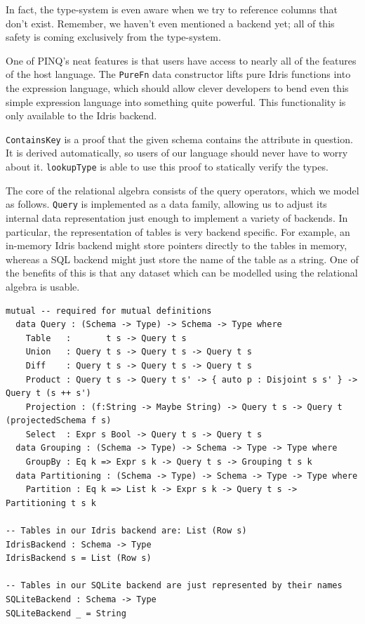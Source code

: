 \documentclass[12pt]{article}
\begin{document}
In fact, the type-system is even aware when we try to reference columns that don't exist.
Remember, we haven't even mentioned a backend yet; all of this safety is coming exclusively from the type-system.

One of PINQ's neat features is that users have access to nearly all of the features of the host language.
The \texttt{PureFn} data constructor lifts pure Idris functions into the expression language, which should allow clever developers to bend even this simple expression language into something quite powerful.
This functionality is only available to the Idris backend.

\texttt{ContainsKey} is a proof that the given schema contains the attribute in question.
It is derived automatically, so users of our language should never have to worry about it.
\texttt{lookupType} is able to use this proof to statically verify the types.

The core of the relational algebra consists of the query operators, which we model as follows.
\texttt{Query} is implemented as a data family, allowing us to adjust its internal data representation just enough to implement a variety of backends.
In particular, the representation of tables is very backend specific.
For example, an in-memory Idris backend might store pointers directly to the tables in memory, whereas a SQL backend might just store the name of the table as a string.
One of the benefits of this is that any dataset which can be modelled using the relational algebra is usable.

\begin{lstlisting}
mutual -- required for mutual definitions
  data Query : (Schema -> Type) -> Schema -> Type where
    Table   :       t s -> Query t s
    Union   : Query t s -> Query t s -> Query t s
    Diff    : Query t s -> Query t s -> Query t s
    Product : Query t s -> Query t s' -> { auto p : Disjoint s s' } -> Query t (s ++ s')
    Projection : (f:String -> Maybe String) -> Query t s -> Query t (projectedSchema f s)
    Select  : Expr s Bool -> Query t s -> Query t s
  data Grouping : (Schema -> Type) -> Schema -> Type -> Type where
    GroupBy : Eq k => Expr s k -> Query t s -> Grouping t s k
  data Partitioning : (Schema -> Type) -> Schema -> Type -> Type where
    Partition : Eq k => List k -> Expr s k -> Query t s -> Partitioning t s k

-- Tables in our Idris backend are: List (Row s)
IdrisBackend : Schema -> Type
IdrisBackend s = List (Row s)

-- Tables in our SQLite backend are just represented by their names
SQLiteBackend : Schema -> Type
SQLiteBackend _ = String
\end{lstlisting}
\end{document}

